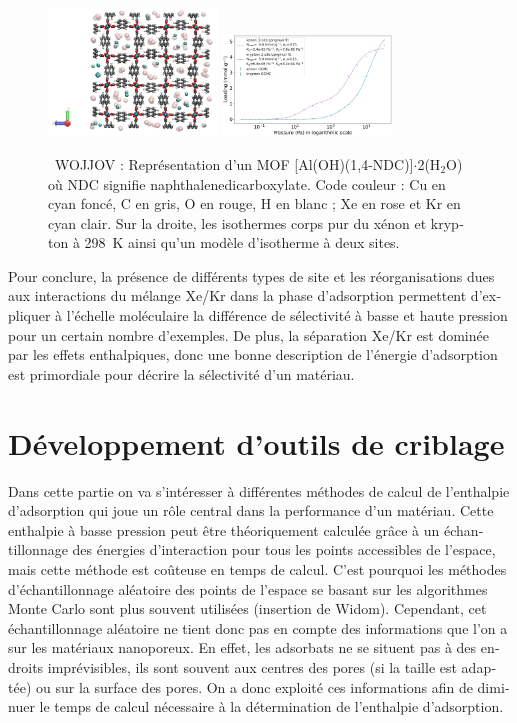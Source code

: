 \documentclass[thesis]{subfiles}
\begin{document}
\begin{otherlanguage}{french}
\begin{figure}[h]
\centering
  \includegraphics[width=0.4\textwidth]{figures/2-thermo/WOJJOV_clean.jpg}
  \includegraphics[width=0.4\textwidth]{figures/2-thermo/WOJJOV_clean_isotherm_xenon_krypton_298K.jpg}
  \caption{\small{\ WOJJOV : Représentation d'un MOF [Al(OH)(1,4-NDC)]$\cdot$2(H$_2$O) où NDC signifie naphthalenedicarboxylate. Code couleur : Cu en cyan foncé, C en gris, O en rouge, H en blanc ; Xe en rose et Kr en cyan clair. Sur la droite, les isothermes corps pur du xénon et krypton à \SI{298}{\kelvin} ainsi qu'un modèle d'isotherme à deux sites.}}
  \label{WOJJOV_resume}
\end{figure}

Pour conclure, la présence de différents types de site et les réorganisations dues aux interactions du mélange Xe/Kr dans la phase d'adsorption permettent d'expliquer à l'échelle moléculaire la différence de sélectivité à basse et haute pression pour un certain nombre d'exemples. De plus, la séparation Xe/Kr est dominée par les effets enthalpiques, donc une bonne description de l'énergie d'adsorption est primordiale pour décrire la sélectivité d'un matériau.

\section*{Développement d'outils de criblage}

Dans cette partie on va s'intéresser à différentes méthodes de calcul de l'enthalpie d'adsorption qui joue un rôle central dans la performance d'un matériau. Cette enthalpie à basse pression peut être théoriquement calculée grâce à un échantillonnage des énergies d'interaction pour tous les points accessibles de l'espace, mais cette méthode est coûteuse en temps de calcul. C'est pourquoi les méthodes d'échantillonnage aléatoire des points de l'espace se basant sur les algorithmes Monte Carlo sont plus souvent utilisées (insertion de Widom). Cependant, cet échantillonnage aléatoire ne tient donc pas en compte des informations que l'on a sur les matériaux nanoporeux. En effet, les adsorbats ne se situent pas à des endroits imprévisibles, ils sont souvent aux centres des pores (si la taille est adaptée) ou sur la surface des pores. On a donc exploité ces informations afin de diminuer le temps de calcul nécessaire à la détermination de l'enthalpie d'adsorption.


\end{otherlanguage}
\end{document}
